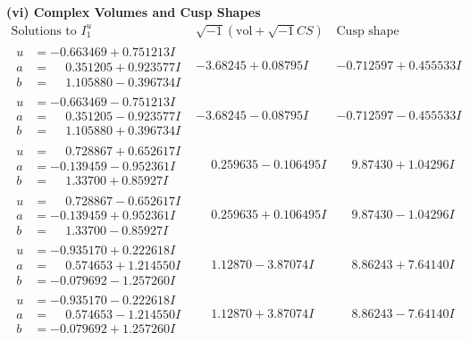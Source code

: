\documentclass[1p]{elsarticle_modified}
\theoremstyle{definition}
\newcommand{\I}{\sqrt{-1}}
\begin{document}
\newpage\flushleft \textbf{(vi) Complex Volumes and Cusp Shapes}
$$\begin{array}{c|c|c}  
\text{Solutions to }I^u_{1}& \I (\text{vol} + \sqrt{-1}CS) & \text{Cusp shape}\\
 \hline 
\begin{aligned}
u &= -0.663469 + 0.751213 I \\
a &= \phantom{-}0.351205 + 0.923577 I \\
b &= \phantom{-}1.105880 - 0.396734 I\end{aligned}
 & -3.68245 + 0.08795 I & -0.712597 + 0.455533 I \\ \hline\begin{aligned}
u &= -0.663469 - 0.751213 I \\
a &= \phantom{-}0.351205 - 0.923577 I \\
b &= \phantom{-}1.105880 + 0.396734 I\end{aligned}
 & -3.68245 - 0.08795 I & -0.712597 - 0.455533 I \\ \hline\begin{aligned}
u &= \phantom{-}0.728867 + 0.652617 I \\
a &= -0.139459 - 0.952361 I \\
b &= \phantom{-}1.33700 + 0.85927 I\end{aligned}
 & \phantom{-}0.259635 - 0.106495 I & \phantom{-}9.87430 + 1.04296 I \\ \hline\begin{aligned}
u &= \phantom{-}0.728867 - 0.652617 I \\
a &= -0.139459 + 0.952361 I \\
b &= \phantom{-}1.33700 - 0.85927 I\end{aligned}
 & \phantom{-}0.259635 + 0.106495 I & \phantom{-}9.87430 - 1.04296 I \\ \hline\begin{aligned}
u &= -0.935170 + 0.222618 I \\
a &= \phantom{-}0.574653 + 1.214550 I \\
b &= -0.079692 - 1.257260 I\end{aligned}
 & \phantom{-}1.12870 - 3.87074 I & \phantom{-}8.86243 + 7.64140 I \\ \hline\begin{aligned}
u &= -0.935170 - 0.222618 I \\
a &= \phantom{-}0.574653 - 1.214550 I \\
b &= -0.079692 + 1.257260 I\end{aligned}
 & \phantom{-}1.12870 + 3.87074 I & \phantom{-}8.86243 - 7.64140 I \\ \hline\begin{aligned}

\end{aligned}
\end{array}$$
\end{document}
